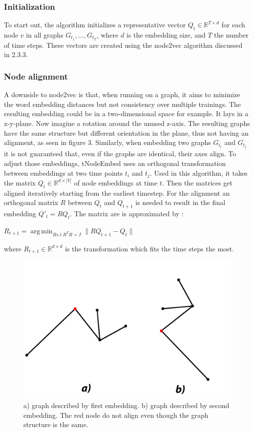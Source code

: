 \documentclass[sigconf]{acmart}
\DeclareMathOperator*{\argmin}{arg\,min}
\begin{document}
\subsubsection{Initialization}
To start out, the algorithm initializes a representative vector \(Q_t \in \mathbb{R}^{T \times d}\) for each node \(v\) in all graphs \(G_{t_1}, \ldots, G_{t_T} \), where \(d\) is the embedding size, and \(T\) the number of time steps.
These vectors are created using the node2vec algorithm discussed in 2.3.3.

\subsubsection{Node alignment}
A downside to node2vec is that, when running on a graph, it aims to minimize the word embedding distances but not consistency over multiple trainings.
The resulting embedding could be in a two-dimensional space for example. It lays in a x-y-plane. Now imagine a rotation around the unused z-axis. The resulting graphs have the
same structure but different orientation in the plane, thus not having an alignment, as seen in figure 3.
Similarly, when embedding two graphs \(G_{t_i}\) and \(G_{t_j}\) it is not guaranteed that, even if the graphs are identical, their axes align.
To adjust those embeddings, tNodeEmbed uses an orthogonal transformation between embeddings at two time points \(t_i\) and \(t_j\)\cite{Schonemann.1966}.
Used in this algorithm, it takes the matrix \(Q_t \in \mathbb{R}^{d\times |V|}\) of node embeddings at time \(t\). Then the matrices get aligned iteratively starting from the earliest timestep.
For the alignment an orthogonal matrix \(R\) between \(Q_t\) and \(Q_{t+1}\) is needed to result in the final embedding \(Q'_t = RQ_t\).
The matrix are is approximated by : 
\begin{center}
  \(R_{t+1} = \argmin_{R s.t. R^TR =I} \|RQ_{t+1} - Q_t\| \)
\end{center}
where \(R_{t+1} \in \mathbb{R}^{d \times d} \) is the transformation which fits the time steps the most.
\begin{figure}[h]
  \includegraphics[scale=0.1]{UnalignedGraphs.png}
  \caption{a) graph described by first embedding. b) graph described by second embedding. The red node do not align even though the graph structure is the same.}
\end{figure}
\end{document}

